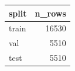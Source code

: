 \begin{tabular}{lr}
\toprule
\textbf{split} & \textbf{n\_rows} \\
\midrule
train & 16530 \\
val & 5510 \\
test & 5510 \\
\bottomrule
\end{tabular}
